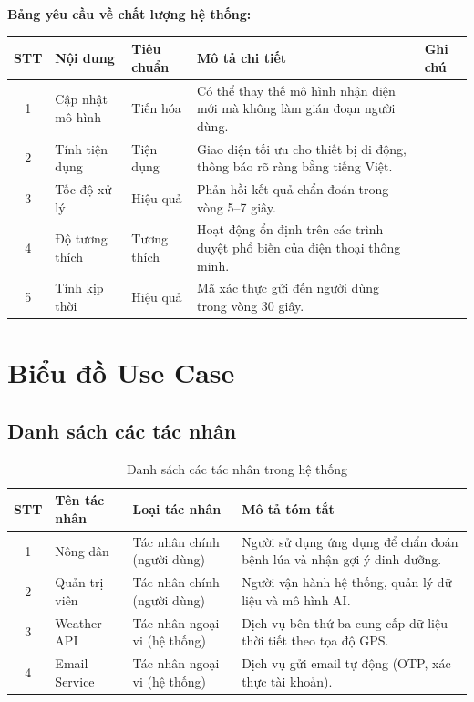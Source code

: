 \documentclass[12pt,a4paper]{article}
\begin{document}
\textbf{Bảng yêu cầu về chất lượng hệ thống:}
\begin{longtable}{|c|l|l|p{6.5cm}|l|}
    \hline
    \rowcolor{headerblue}
    \textbf{STT} & \textbf{Nội dung} & \textbf{Tiêu chuẩn} & \textbf{Mô tả chi tiết}                                                    & \textbf{Ghi chú} \\
    \hline
    \endhead
    1            & Cập nhật mô hình  & Tiến hóa            & Có thể thay thế mô hình nhận diện mới mà không làm gián đoạn người dùng.   &                  \\
    \hline
    2            & Tính tiện dụng    & Tiện dụng           & Giao diện tối ưu cho thiết bị di động, thông báo rõ ràng bằng tiếng Việt.  &                  \\
    \hline
    3            & Tốc độ xử lý      & Hiệu quả            & Phản hồi kết quả chẩn đoán trong vòng 5--7 giây.                           &                  \\
    \hline
    4            & Độ tương thích    & Tương thích         & Hoạt động ổn định trên các trình duyệt phổ biến của điện thoại thông minh. &                  \\
    \hline
    5            & Tính kịp thời     & Hiệu quả            & Mã xác thực gửi đến người dùng trong vòng 30 giây.                         &                  \\
    \hline
\end{longtable}

\hrulefill

\section{Biểu đồ Use Case}

\subsection{Danh sách các tác nhân}

\begin{longtable}{|c|l|p{3.5cm}|p{7.5cm}|}
    \caption{Danh sách các tác nhân trong hệ thống} \\
    \hline
    \rowcolor{headerblue}
    \textbf{STT} & \textbf{Tên tác nhân} & \textbf{Loại tác nhân} & \textbf{Mô tả tóm tắt} \\
    \hline
    \endhead
    1            & Nông dân              & Tác nhân chính (người dùng) & Người sử dụng ứng dụng để chẩn đoán bệnh lúa và nhận gợi ý dinh dưỡng. \\
    \hline
    2            & Quản trị viên         & Tác nhân chính (người dùng) & Người vận hành hệ thống, quản lý dữ liệu và mô hình AI. \\
    \hline
    3            & Weather API           & Tác nhân ngoại vi (hệ thống) & Dịch vụ bên thứ ba cung cấp dữ liệu thời tiết theo tọa độ GPS. \\
    \hline
    4            & Email Service         & Tác nhân ngoại vi (hệ thống) & Dịch vụ gửi email tự động (OTP, xác thực tài khoản). \\
    \hline
\end{longtable}
\end{document}
